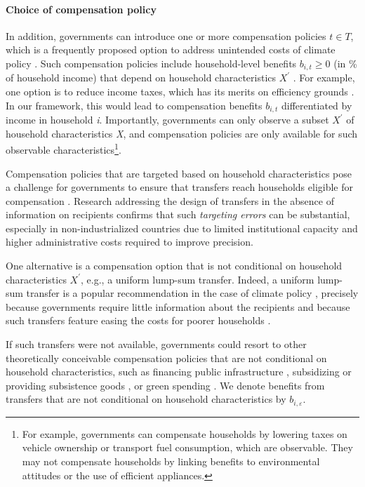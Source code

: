 \documentclass[12pt, a4paper]{article}
\begin{document}
\paragraph{Choice of compensation policy}
In addition, governments can introduce one or more compensation policies $t \in T$, which is a frequently proposed option to address unintended costs of climate policy \autocite{Klenert.2018,Baranzini.2017}. Such compensation policies include household-level benefits $b_{i,t}\geq 0$ (in \% of household income) that depend on household characteristics $X^{\prime}$ \autocite[e.g.,][]{Akerlof.1978}. For example, one option is to reduce income taxes, which has its merits on efficiency grounds \autocite{Pearce.1991,Goulder.1995,Bento.2018}. In our framework, this would lead to compensation benefits $b_{i,t}$ differentiated by income in household \textit{i}. Importantly, governments can only observe a subset $X^{\prime}$ of household characteristics \textit{X}, and compensation policies are only available for such observable characteristics\footnote{For example, governments can compensate households by lowering taxes on vehicle ownership or transport fuel consumption, which are observable. They may not compensate households by linking benefits to environmental attitudes or the use of efficient appliances.}. 

Compensation policies that are targeted based on household characteristics pose a challenge for governments to ensure that transfers reach households eligible for compensation \autocite[e.g.,][]{Hanna.2018}. Research addressing the design of transfers in the absence of information on recipients confirms that such \textit{targeting errors} can be substantial, especially in non-industrialized countries \autocite{WorldBank.2018, Robles.2019,Bah.2019} due to limited institutional capacity \autocite[e.g.,][]{Besley.2009} and higher administrative costs \autocite{Coady.2004} required to improve precision.

One alternative is a compensation option that is not conditional on household characteristics $X^{\prime}$, e.g., a uniform lump-sum transfer. Indeed, a uniform lump-sum transfer is a popular recommendation in the case of climate policy \autocite{Stiglitz.2017,Baranzini.2000,Metcalf.2009,Sager.2023}, precisely because governments require little information about the recipients and because such transfers feature easing the costs for poorer households \autocite{Budolfson.2021,vanderPloeg.2022}. 

If such transfers were not available, governments could resort to other theoretically conceivable compensation policies that are not conditional on household characteristics, such as financing public infrastructure \autocite{Franks.2018,Jakob.2016}, subsidizing or providing subsistence goods \autocite{Greve.2022,Schaffitzel.2019}, or green spending \autocite{Sommer.2022,Kotchen.2017,Dechezlepretre.2025}. We denote benefits from transfers that are not conditional on household characteristics by $b_{i,\varepsilon}$.
\end{document}

